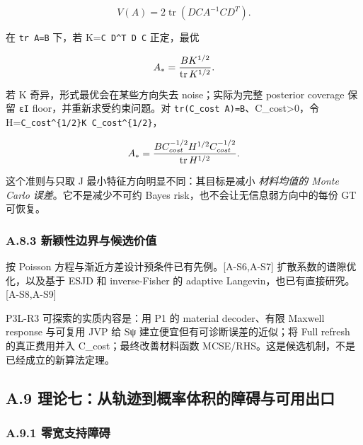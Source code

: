 \documentclass[
  11pt,
  a4paper,
]{article}
\begin{document}
\[
V(A)=2\operatorname{tr}(D C A^{-1}C D^T).
\]

在 \texttt{tr\ A=B} 下，若 K=\texttt{C\ D\^{}T\ D\ C} 正定，最优

\[
A_*={B K^{1/2}\over\operatorname{tr}K^{1/2}}.
\]

若 K 奇异，形式最优会在某些方向失去 noise；实际为完整 posterior coverage
保留 \texttt{εI} floor，并重新求受约束问题。对
\texttt{tr(C\_\allowbreak{}cost\ A)=B}、C\_\allowbreak{}cost\textgreater0，令
H=\texttt{C\_\allowbreak{}cost\^{}\{1/2\}K\ C\_\allowbreak{}cost\^{}\{1/2\}}，

\[
A_*={B C_{cost}^{-1/2}H^{1/2}C_{cost}^{-1/2}\over\operatorname{tr}H^{1/2}}.
\]

这个准则与只取 J 最小特征方向明显不同：其目标是减小 \emph{材料均值的
Monte Carlo 误差}。它不是减少不可约 Bayes
risk，也不会让无信息弱方向中的每份 GT 可恢复。

\hypertarget{a.8.3-ux65b0ux9896ux6027ux8fb9ux754cux4e0eux5019ux9009ux4ef7ux503c}{%
\subsubsection{A.8.3
新颖性边界与候选价值}\label{a.8.3-ux65b0ux9896ux6027ux8fb9ux754cux4e0eux5019ux9009ux4ef7ux503c}}

按 Poisson 方程与渐近方差设计预条件已有先例。{[}A-S6,A-S7{]}
扩散系数的谱隙优化，以及基于 ESJD 和 inverse-Fisher 的 adaptive
Langevin，也已有直接研究。{[}A-S8,A-S9{]}

P3L-R3 可探索的实质内容是：用 P1 的 material decoder、有限 Maxwell
response 与可复用 JVP 给 Sψ 建立便宜但有可诊断误差的近似；将 Full
refresh 的真正费用并入 C\_\allowbreak{}cost；最终改善材料函数
MCSE/RHS。这是候选机制，不是已经成立的新算法定理。

\hypertarget{a.9-ux7406ux8bbaux4e03ux4eceux8f68ux8ff9ux5230ux6982ux7387ux4f53ux79efux7684ux969cux788dux4e0eux53efux7528ux51faux53e3}{%
\subsection{A.9
理论七：从轨迹到概率体积的障碍与可用出口}\label{a.9-ux7406ux8bbaux4e03ux4eceux8f68ux8ff9ux5230ux6982ux7387ux4f53ux79efux7684ux969cux788dux4e0eux53efux7528ux51faux53e3}}

\hypertarget{a.9.1-ux96f6ux5bbdux652fux6301ux969cux788d}{%
\subsubsection{A.9.1
零宽支持障碍}\label{a.9.1-ux96f6ux5bbdux652fux6301ux969cux788d}}
\end{document}

